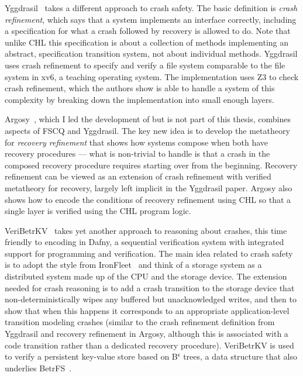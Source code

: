 Yggdrasil~\cite{sigurbjarnarson:yggdrasil} takes a different approach to crash
safety. The basic definition is \emph{crash refinement}, which says that a
system implements an interface correctly, including a specification for what a
crash followed by recovery is allowed to do. Note that unlike CHL this
specification is about a collection of methods implementing an abstract,
specification transition system, not about individual methods. Yggdrasil uses
crash refinement to specify and verify a file system comparable to the file
system in xv6, a teaching operating system. The implementation uses Z3 to check
crash refinement, which the authors show is able to handle a system of this
complexity by breaking down the implementation into small enough layers.

Argosy~\cite{chajed:argosy}, which I led the development of but is not part of
this thesis, combines aspects of FSCQ and Yggdrasil. The key new idea is to
develop the metatheory for \emph{recovery refinement} that shows how systems
compose when both have recovery procedures --- what is non-trivial to handle is
that a crash in the composed recovery procedure requires starting over from the
beginning. Recovery refinement can be viewed as an extension of crash refinement
with verified metatheory for recovery, largely left implicit in the Yggdrasil
paper. Argosy also shows how to encode the conditions of recovery refinement
using CHL so that a single layer is verified using the CHL program logic.

VeriBetrKV~\cite{hance:veribetrkv} takes yet another approach to reasoning about
crashes, this time friendly to encoding in Dafny, a sequential verification
system with integrated support for programming and verification. The main idea
related to crash safety is to adopt the style from
IronFleet~\cite{hawblitzel:ironfleet} and think of a storage system as a
distributed system made up of the CPU and the storage device. The extension
needed for crash reasoning is to add a crash transition to the storage device
that non-deterministically wipes any buffered but unacknowledged writes, and
then to show that when this happens it corresponds to an appropriate
application-level transition modeling crashes (similar to the crash refinement
definition from Yggdrasil and recovery refinement in Argosy, although this is
associated with a code transition rather than a dedicated recovery procedure).
VeriBetrKV is used to verify a persistent key-value store based on
B\textsuperscript{$\epsilon$} trees, a data structure that also underlies
BetrFS~\cite{jannen:betrfs}.


